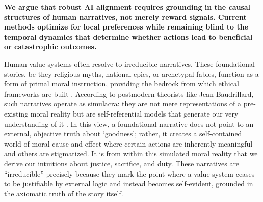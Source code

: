 \documentclass{article}
\theoremstyle{plain}
\theoremstyle{definition}
\theoremstyle{remark}
\begin{document}
\textbf{We argue that robust AI alignment requires grounding in the causal structures of human narratives, not merely reward signals. Current methods optimize for local preferences while remaining blind to the temporal dynamics that determine whether actions lead to beneficial or catastrophic outcomes.}

Human value systems often resolve to irreducible narratives. These foundational stories, be they religious myths, national epics, or archetypal fables, function as a form of primal moral instruction, providing the bedrock from which ethical frameworks are built \cite{macintyre81, bruner86}. According to postmodern theorists like Jean Baudrillard, such narratives operate as simulacra: they are not mere representations of a pre-existing moral reality but are self-referential models that generate our very understanding of it \cite{baudrillard94}. In this view, a foundational narrative does not point to an external, objective truth about `goodness'; rather, it creates a self-contained world of moral cause and effect where certain actions are inherently meaningful and others are stigmatized. It is from within this simulated moral reality that we derive our intuitions about justice, sacrifice, and duty. These narratives are ``irreducible'' precisely because they mark the point where a value system ceases to be justifiable by external logic and instead becomes self-evident, grounded in the axiomatic truth of the story itself.
\end{document}
